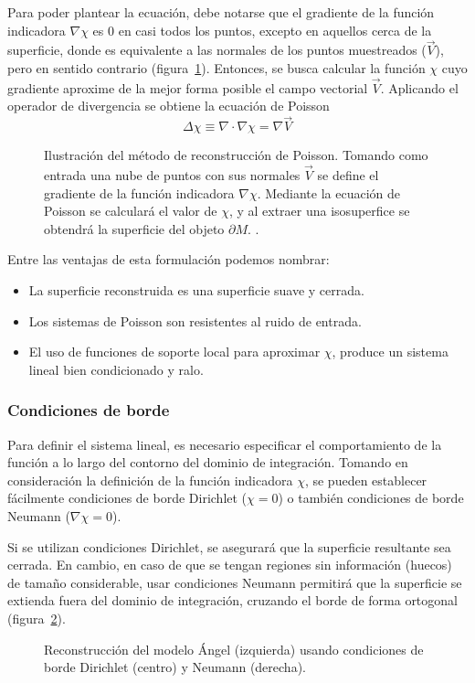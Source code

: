 Para poder plantear la ecuación, debe notarse que el gradiente de la función indicadora $\nabla \chi$
es 0 en casi todos los puntos, excepto en aquellos cerca de la superficie,
donde es equivalente a las normales de los puntos muestreados ($\vec{V}$), pero en sentido contrario (figura~\ref{fig:poiss_planteo}).
Entonces, se busca calcular la función $\chi$ cuyo gradiente aproxime de la mejor forma posible el
campo vectorial $\vec{V}$.
Aplicando  el operador de divergencia se obtiene la ecuación de Poisson
\[ \Delta\chi \equiv \nabla \cdot \nabla \chi = \nabla\vec{V} \]

\begin{figure}
	\centering
	
	\caption[Ilustración del método de reconstrucción de Poisson]{\label{fig:poiss_planteo}Ilustración del método de reconstrucción de Poisson.
	Tomando como entrada una nube de puntos con sus normales $\vec{V}$ se define el gradiente de la función
	indicadora $\nabla \chi$. Mediante la ecuación de Poisson se calculará el valor de $\chi$,
	y al extraer una isosuperfice se obtendrá la superficie del objeto $\partial M$. 
	.
	}
\end{figure}

Entre las ventajas de esta formulación podemos nombrar:
\begin{itemize}
	\item La superficie reconstruida es una superficie suave y cerrada.
	\item Los sistemas de Poisson son resistentes al ruido de entrada.
	\item El uso de funciones de soporte local para aproximar $\chi$,
		produce un sistema lineal bien condicionado y ralo.\cite{Kazhdan:2006:PSR:1281957.1281965}
\end{itemize}

	\subsubsection{Condiciones de borde}
	Para definir el sistema lineal, es necesario especificar el
	comportamiento de la función a lo largo del contorno del dominio de
	integración.
	Tomando en consideración la definición de la función indicadora $\chi$,
	se pueden establecer fácilmente condiciones de borde Dirichlet ($\chi = 0$)
	o también condiciones de borde Neumann ($\nabla \chi = 0$).

	Si se utilizan condiciones Dirichlet, se asegurará que la superficie resultante sea cerrada.
	En cambio, en caso de que se tengan regiones sin información (huecos) de tamaño
	considerable, usar condiciones Neumann permitirá que la superficie se
	extienda fuera del dominio de integración, cruzando el borde de forma
	ortogonal (figura~\ref{fig:poisson_boundary})\cite{Kazhdan_screenedpoisson}.
	\begin{figure}
		\caption[Reconstrucción del modelo Ángel  usando condiciones de borde Dirichlet  y Neumann]{\label{fig:poisson_boundary}Reconstrucción del modelo Ángel (izquierda) usando condiciones de borde Dirichlet (centro) y Neumann (derecha).}
	\end{figure}


